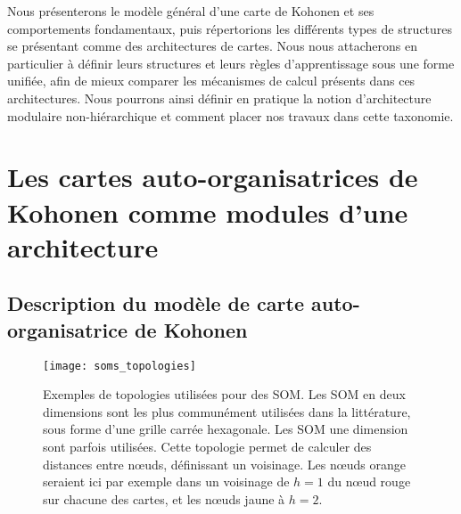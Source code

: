 \documentclass[../main]{subfiles}
\begin{document}
Nous présenterons le modèle général d'une carte de Kohonen et ses comportements fondamentaux, puis répertorions les différents types de structures se présentant comme des architectures de cartes. 
Nous nous attacherons en particulier à définir leurs structures et leurs règles d'apprentissage sous une forme unifiée, afin de mieux comparer les mécanismes de calcul présents dans ces architectures.
Nous pourrons ainsi définir en pratique la notion d'architecture modulaire non-hiérarchique et comment placer nos travaux dans cette taxonomie.

\section{Les cartes auto-organisatrices de Kohonen comme modules d'une architecture}\label{sec:som001}

\subsection{Description du modèle de carte auto-organisatrice de Kohonen}\label{sec:modele_som}

\begin{figure}
    \centering
    \texttt{[image: soms\_topologies]}
    \caption{Exemples de topologies utilisées pour des SOM. 
    Les SOM en deux dimensions sont les plus communément utilisées dans la littérature, sous forme d'une grille carrée hexagonale. Les SOM une dimension sont parfois utilisées. Cette topologie permet de calculer des distances entre n\oe{}uds, définissant un voisinage. Les n\oe{}uds orange seraient ici par exemple dans un voisinage de $h = 1$ du n\oe{}ud rouge sur chacune des cartes, et les n\oe{}uds jaune à $h = 2$.
    \label{fig:topo}}
    \end{figure}
\end{document}
